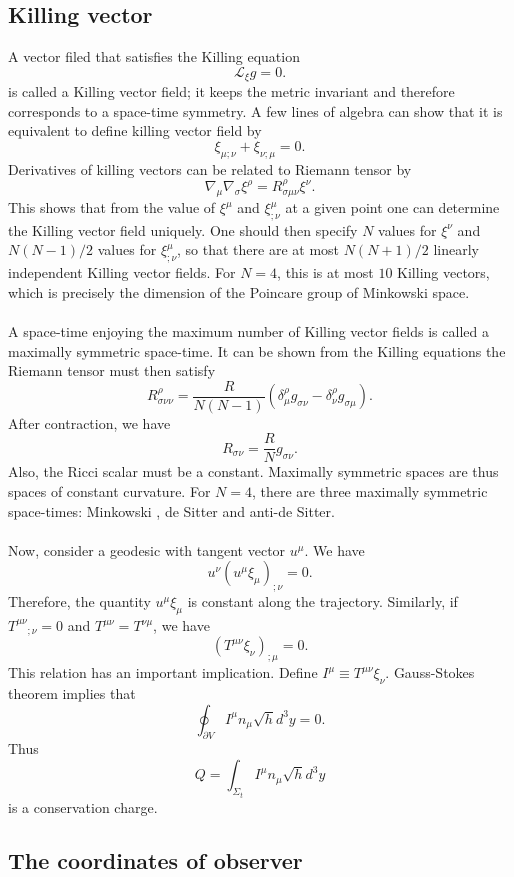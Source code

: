\subsection{Killing vector}
A vector filed that satisfies the Killing equation
\[\mathcal{L}_{\xi}g = 0.\]
is called a Killing vector field; it keeps the metric invariant and therefore corresponds to a space-time symmetry. A few lines of algebra can show that it is equivalent to define killing vector field by
\[\xi_{\mu;\nu} + \xi_{\nu;\mu} = 0.\]
Derivatives of killing vectors can be related to Riemann tensor by
\[\nabla_{\mu} \nabla_{\sigma}\xi^{\rho} = R^{\rho}_{\sigma\mu\nu}\xi^{\nu}.\]
This shows that from the value of $\xi^{\mu}$ and $\xi^{\mu}_{;\nu}$ at a given point one can determine the Killing vector field uniquely. One should then specify $N$ values for $\xi^{\nu}$ and $N(N-1)/2$ values for $\xi^{\mu}_{;\nu}$, so that there are at most $N(N+1)/2$ linearly independent Killing vector fields. For $N=4$,
this is at most $10$ Killing vectors, which is precisely the dimension of the Poincare group of Minkowski space.
\\ \\
A space-time enjoying the maximum number of Killing vector fields is called a maximally symmetric space-time. It can be shown from the Killing equations the Riemann tensor must then satisfy
\[R^{\rho}_{\sigma\nu\nu} = \frac{R}{N(N-1)} (\delta^{\rho}_{\mu}g_{\sigma\nu} - \delta^{\rho}_{\nu}g_{\sigma\mu}).\]
After contraction, we have
\[R_{\sigma\nu} = \frac{R}{N}g_{\sigma\nu}.\]
Also, the Ricci scalar must be a constant. Maximally symmetric spaces are thus spaces of constant curvature. 
For $N =4$, there are three maximally symmetric space-times:
Minkowski , de Sitter and anti-de Sitter.
\\ \\
Now, consider a geodesic with tangent vector $u^{\mu}$. We have
\[u^{\nu}(u^{\mu}\xi_{\mu})_{;\nu} = 0.\]
Therefore, the quantity $u^{\mu}\xi_{\mu}$ is constant along the trajectory.
Similarly, if $T^{\mu\nu}_{\phantom{xx} ;\nu} = 0$ and $T^{\mu\nu}=T^{\nu\mu}$, we have
\[(T^{\mu\nu}\xi_{\nu})_{;\mu} = 0.\]
This relation has an important implication. Define $I^{\mu} \equiv T^{\mu\nu}\xi_{\nu}$. Gauss-Stokes theorem implies that
\[\oint_{\partial V} I^{\mu}n_{\mu} \sqrt{h}d^3y = 0.\]
Thus
\[Q = \int_{\Sigma_t} I^{\mu}n_{\mu} \sqrt{h}d^3y\]
is a conservation charge.

\subsection{The coordinates of observer}
